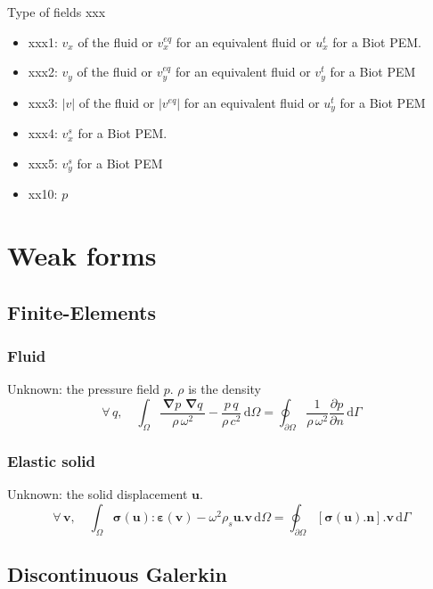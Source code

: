 \documentclass[11pt,A4paper]{book}
\newcommand{\tb}{\textbf}
\newcommand{\bs}{\boldsymbol}
\newcommand{\pt}{\textbf{.}}
\newcommand{\esp}{, \quad}
\newcommand{\p}{\partial}
\newcommand{\abs}[1]{ \left\vert #1 \right\vert}
\newcommand{\Gd}[1]{\,\boldsymbol{\nabla}#1\,}
\renewcommand{\d}{\,\textrm{d}}
\newcommand{\oiom}{\oint_{\partial \Omega}}
\newcommand{\iom}{\int_{\Omega}}
\renewcommand{\:}{\tb{:}}
\newcommand{\eps}{\varepsilon}
\begin{document}
Type of fields xxx
\begin{itemize}
	\item xxx1: $v_x$ of the fluid or $v^{eq}_x$ for an equivalent fluid or $u^t_x$ for a Biot PEM.
	\item xxx2: $v_y$ of the fluid or $v^{eq}_y$ for an equivalent fluid or $v^t_y$ for a Biot PEM
	\item xxx3: $\abs{v}$ of the fluid or $\abs{v^{eq}}$ for an equivalent fluid or $u^t_y$ for a Biot PEM
	\item xxx4: $v^s_x$ for a Biot PEM.
	\item xxx5: $v^s_y$ for a Biot PEM	
	\item xx10: $p$
\end{itemize}

\chapter{Weak forms}

\section{Finite-Elements}

\subsection{Fluid}
Unknown: the pressure field $p$. $\rho$ is the density
\begin{equation}
\forall\, q\esp 	\iom \dfrac{\Gd p \Gd q}{\rho\,\omega^2} - \dfrac{p\, q}{\rho\, c^2}
\d\Omega =\oiom \dfrac{1}{\rho\, \omega^2}\dfrac{\p p}{\p n} \d\Gamma
\end{equation}

\subsection{Elastic solid}
Unknown: the solid displacement $\tb{u}$. 
\begin{equation}
\forall\, \tb{v}\esp 	\iom 
\bs{\sigma}(\tb{u}):\bs{\eps}(\tb{v}) -\omega^2\rho_s \tb{u}\pt\tb{v}
\d\Omega =\oiom [\bs{\sigma}(\tb{u})\pt\tb{n}]\pt \tb{v} \d\Gamma
\end{equation}

\section{Discontinuous Galerkin}
\end{document}
